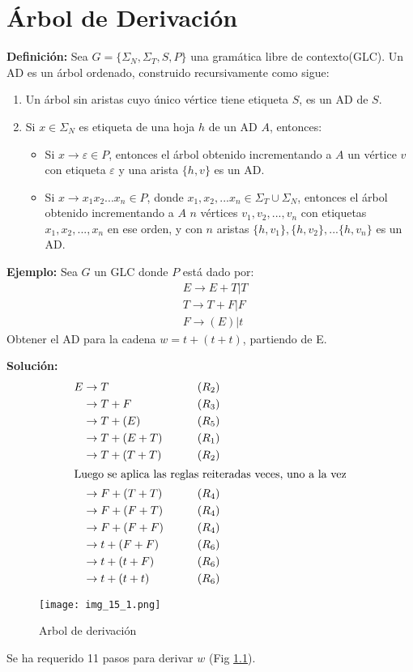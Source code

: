 \chapter{Árbol de Derivación}
\textbf{Definición: }Sea $G=\{\Sigma_N,\Sigma_T,S,P\}$ una gramática libre de contexto(GLC). Un AD es un árbol ordenado, construido recursivamente como sigue:
\begin{enumerate}
\item Un árbol sin aristas cuyo único vértice tiene etiqueta $S$, es un AD de $S$.
\item Si $x\in \Sigma_N$ es etiqueta de una hoja $h$ de un AD $A$, entonces:
	\begin{itemize}
	\item Si $x\rightarrow \varepsilon \in P$, entonces el árbol obtenido incrementando a $A$ un vértice $v$ con etiqueta $\varepsilon$ y una arista $\{h,v\}$ es un AD.
	\item Si $x\rightarrow x_1x_2...x_n \in P$, donde $x_1,x_2,...x_n \in \Sigma_T \cup \Sigma_N$, entonces el árbol obtenido incrementando a $A$ $n$ vértices $v_1,v_2,...,v_n$ con etiquetas $x_1,x_2,...,x_n$ en ese orden, y con $n$ aristas $\{h,v_1\},\{h,v_2\},...\{h,v_n\}$ es un AD. 
	\end{itemize}
\end{enumerate}

\textbf{Ejemplo: }Sea $G$ un GLC donde $P$ está dado por:
\begin{align*}
& E\rightarrow E+T|T	\\
& T\rightarrow T+F|F	\\
& F\rightarrow (E)|t
\end{align*}
Obtener el AD para la cadena $w=t+(t+t)$, partiendo de E.

\textbf{Solución: }
\begin{align*}
E	&\rightarrow T			&\qquad (R_2)\\
	&\rightarrow T+F		&\qquad (R_3)\\
	&\rightarrow T+(E)		&\qquad (R_5)\\
	&\rightarrow T+(E+T)	&\qquad (R_1)\\
	&\rightarrow T+(T+T)	&\qquad (R_2)\\
\intertext{Luego se aplica las reglas reiteradas veces, uno a la vez}
	&\rightarrow F+(T+T)	&\qquad (R_4)\\
	&\rightarrow F+(F+T)	&\qquad (R_4)\\
	&\rightarrow F+(F+F)	&\qquad (R_4)\\
	&\rightarrow t+(F+F)	&\qquad (R_6)\\
	&\rightarrow t+(t+F)	&\qquad (R_6)\\
	&\rightarrow t+(t+t)	&\qquad (R_6)
\end{align*}
\begin{figure}[h!]
\centering
\texttt{[image: img\_15\_1.png]}
\caption{Arbol de derivación}\label{img_15_1}
\end{figure}
Se ha requerido 11 pasos para derivar $w$ (Fig \ref{img_15_1}).

